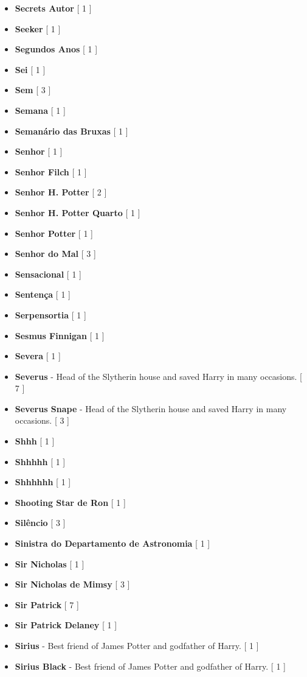 \documentclass[a4paper]{article}
\begin{document}
{\begin{itemize}
	\item \textbf{Secrets Autor} [ 1 ]
	\item \textbf{Seeker} [ 1 ]
	\item \textbf{Segundos Anos} [ 1 ]
	\item \textbf{Sei} [ 1 ]
	\item \textbf{Sem} [ 3 ]
	\item \textbf{Semana} [ 1 ]
	\item \textbf{Semanário das Bruxas} [ 1 ]
	\item \textbf{Senhor} [ 1 ]
	\item \textbf{Senhor Filch} [ 1 ]
	\item \textbf{Senhor H. Potter} [ 2 ]
	\item \textbf{Senhor H. Potter Quarto} [ 1 ]
	\item \textbf{Senhor Potter} [ 1 ]
	\item \textbf{Senhor do Mal} [ 3 ]
	\item \textbf{Sensacional} [ 1 ]
	\item \textbf{Sentença} [ 1 ]
	\item \textbf{Serpensortia} [ 1 ]
	\item \textbf{Sesmus Finnigan} [ 1 ]
	\item \textbf{Severa} [ 1 ]
	\item \textbf{Severus} - Head of the Slytherin house and saved Harry in many occasions. [ 7 ]
	\item \textbf{Severus Snape} - Head of the Slytherin house and saved Harry in many occasions. [ 3 ]
	\item \textbf{Shhh} [ 1 ]
	\item \textbf{Shhhhh} [ 1 ]
	\item \textbf{Shhhhhh} [ 1 ]
	\item \textbf{Shooting Star de Ron} [ 1 ]
	\item \textbf{Silêncio} [ 3 ]
	\item \textbf{Sinistra do Departamento de Astronomia} [ 1 ]
	\item \textbf{Sir Nicholas} [ 1 ]
	\item \textbf{Sir Nicholas de Mimsy} [ 3 ]
	\item \textbf{Sir Patrick} [ 7 ]
	\item \textbf{Sir Patrick Delaney} [ 1 ]
	\item \textbf{Sirius} - Best friend of James Potter and godfather of Harry. [ 1 ]
	\item \textbf{Sirius Black} - Best friend of James Potter and godfather of Harry. [ 1 ]

\end{itemize}}
\end{document}
